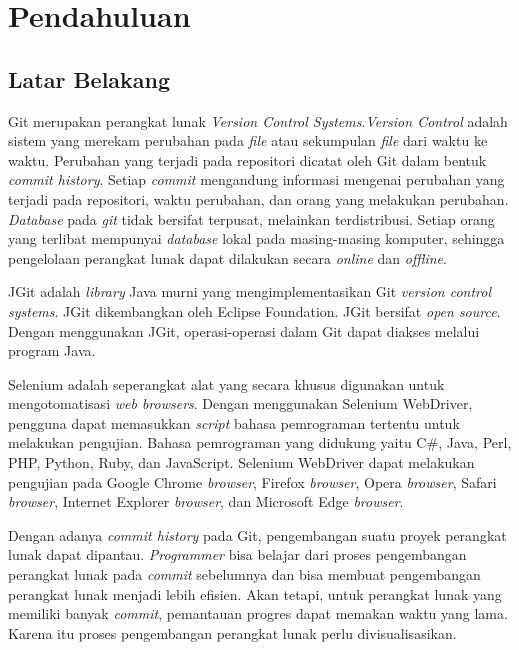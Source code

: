 \chapter{Pendahuluan}
\label{chap:intro}
   
\section{Latar Belakang}
\label{sec:label}
Git merupakan perangkat lunak \textit{Version Control Systems}\cite{chacon2014pro}.\textit{Version Control} adalah sistem yang merekam perubahan pada \textit{file} atau sekumpulan \textit{file} dari waktu ke waktu. Perubahan yang terjadi pada repositori dicatat oleh Git dalam bentuk \textit{commit history}. Setiap \textit{commit} mengandung informasi mengenai perubahan yang terjadi pada repositori, waktu perubahan, dan orang yang melakukan perubahan. \textit{Database} pada \textit{git} tidak bersifat terpusat, melainkan terdistribusi. Setiap orang yang terlibat mempunyai \textit{database} lokal pada masing-masing komputer, sehingga pengelolaan perangkat lunak dapat dilakukan secara \textit{online} dan \textit{offline}.

JGit adalah \textit{library} Java murni yang mengimplementasikan Git \textit{version control systems}\cite{JGit}. JGit dikembangkan oleh Eclipse Foundation. JGit bersifat \textit{open source}. Dengan menggunakan JGit, operasi-operasi dalam Git dapat diakses melalui program Java. 

Selenium adalah seperangkat alat yang secara khusus digunakan untuk mengotomatisasi \textit{web browsers}\cite{Selenium}. Dengan menggunakan Selenium WebDriver, pengguna dapat memasukkan \textit{script} bahasa pemrograman tertentu untuk melakukan pengujian. Bahasa pemrograman yang didukung yaitu C\#, Java, Perl, PHP, Python, Ruby, dan JavaScript. Selenium WebDriver dapat melakukan pengujian pada Google Chrome \textit{browser},  Firefox \textit{browser}, Opera \textit{browser}, Safari \textit{browser}, Internet Explorer \textit{browser}, dan Microsoft Edge \textit{browser}.  


Dengan adanya \textit{commit history} pada Git, pengembangan suatu proyek perangkat lunak dapat dipantau. 
\textit{Programmer} bisa belajar dari proses pengembangan perangkat lunak pada \textit{commit} sebelumnya dan bisa membuat pengembangan perangkat lunak menjadi lebih efisien. Akan tetapi, untuk perangkat lunak yang memiliki banyak \textit{commit}, pemantauan progres dapat memakan waktu yang lama. Karena itu proses pengembangan perangkat lunak perlu divisualisasikan. 
  

